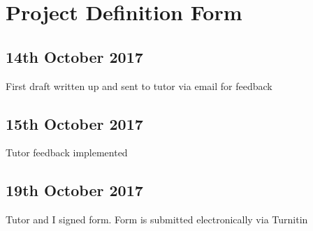 \section{Project Definition Form}

\subsection{14th October 2017}

First draft written up and sent to tutor via email for feedback

\subsection{15th October 2017}

Tutor feedback implemented

\subsection{19th October 2017}

Tutor and I signed form. Form is submitted electronically via Turnitin
